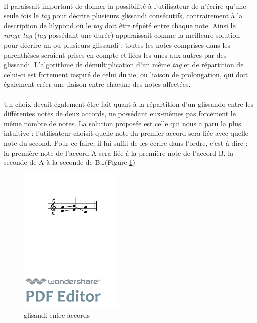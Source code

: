 \documentclass[a4paper,10pt,twocolumn]{article}
\newenvironment{code}
  {\fontfamily{pnc}\selectfont}{}
\begin{document}
\paragraph{}
Il paraissait important de donner la possibilité à l'utilisateur de n'écrire qu'une seule fois le \emph{tag} pour décrire plusieurs glissandi consécutifs, contrairement à la description de lilypond où le \emph{tag} doit être répété entre chaque note. Ainsi le \emph{range-tag} (\emph{tag} possédant une durée) apparaissait comme la meilleure solution pour décrire un ou plusieurs glissandi : toutes les notes comprises dans les parenthèses seraient prises en compte et liées les unes aux autres par des glissandi. L'algorithme de démultiplication d'un même \emph{tag} et de répartition de celui-ci est fortement inspiré de celui du tie, ou liaison de prolongation, qui doit également créer une liaison entre chacune des notes affectées.

\paragraph{}
Un choix devait également être fait quant à la répartition d'un glissando entre les différentes notes de deux accords, ne possédant eux-mêmes pas forcément le même nombre de notes. La solution proposée est celle qui nous a paru la plus intuitive : l'utilisateur choisit quelle note du premier accord sera liée avec quelle note du second. Pour ce faire, il lui suffit de les écrire dans l'ordre, c'est à dire : la première note de l'accord A sera liée à la première note de l'accord B, la seconde de A à la seconde de B\dots (Figure \ref{fig:glissandosimple})

\begin{figure}[h]
\begin{center}
\begin{code}
[\textbackslash{}glissando(\{e,a\} \{f,b\} \{a,d\})]
\end{code}

\includegraphics[width=5cm]{img/glissandosimple.pdf}
\caption{glisandi entre accords}
\label{fig:glissandosimple}
\end{center}
\end{figure}
\end{document}
